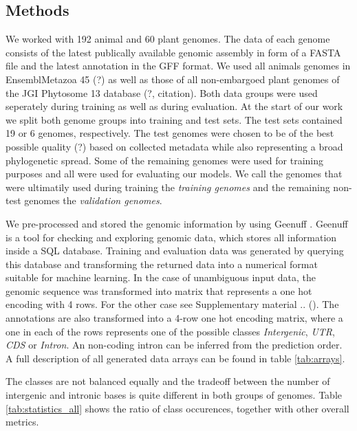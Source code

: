 \documentclass{bioinfo}
\begin{document}
\begin{methods}
\section{Methods}
	We worked with 192 animal and 60 plant genomes. The data of each genome consists of the latest publically available genomic assembly in form of a FASTA file and the latest annotation in the GFF format. We used all animals genomes in EnsemblMetazoa 45 (?) \citealp{Howe19} as well as those of all non-embargoed plant genomes of the JGI Phytosome 13 database (?, citation). Both data groups were used seperately during training as well as during evaluation. At the start of our work we split both genome groups into training and test sets. The test sets contained 19 or 6 genomes, respectively. The test genomes were chosen to be of the best possible quality (?) based on collected metadata while also representing a broad phylogenetic spread. Some of the remaining genomes were used for training purposes and all were used for evaluating our models. We call the genomes that were ultimatily used during training the {\it training genomes} and the remaining non-test genomes the {\it validation genomes}.

We pre-processed and stored the genomic information by using Geenuff \citealp{Denton19}. Geenuff is a tool for checking and exploring genomic data, which stores all information inside a SQL database. Training and evaluation data was generated by querying this database and transforming the returned data into a numerical format suitable for machine learning. In the case of unambiguous input data, the genomic sequence was transformed into matrix that represents a one hot encoding with 4 rows. For the other case see Supplementary material .. (). The annotations are also transformed into a 4-row one hot encoding matrix, where a one in each of the rows represents one of the possible classes {\it Intergenic}, {\it UTR}, {\it CDS} or {\it Intron}. An non-coding intron can be inferred from the prediction order. A full description of all generated data arrays can be found in table \ref{tab:arrays}.

The classes are not balanced equally and the tradeoff between the number of intergenic and intronic bases is quite different in both groups of genomes. Table \ref{tab:statistics_all} shows the ratio of class occurences, together with other overall metrics.


\end{methods}
\end{document}
